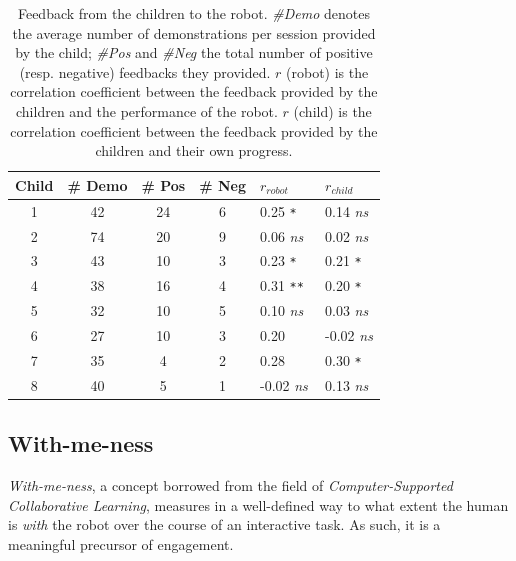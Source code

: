 \documentclass[10pt,a4paper]{article}
\begin{document}
\begin{table}
    \centering
    \caption{\footnotesize Feedback from the children to the robot. \emph{\#Demo}
        denotes the average number of demonstrations per session provided by the child;
        \emph{\#Pos} and \emph{\#Neg} the total number of positive (resp.
        negative) feedbacks they provided. $r$ (robot) is the correlation coefficient
        between the feedback provided by the children and the performance of the
        robot. $r$ (child) is the correlation coefficient
        between the feedback provided by the children and their own progress.
        }
    \begin{tabular}{ccccll}
        \toprule
        \bf Child      & \bf \# Demo & \bf \# Pos & \bf \# Neg & $r_{robot}$ & $r_{child}$ \\ \midrule
        1 & 42           & 24              & 6               & 0.25 \small\tt ** & 0.14 \small\it ns\\ 
        2 & 74           & 20              & 9               & 0.06 \small\it ns & 0.02 \small\it ns\\
        3 & 43           & 10              & 3               & 0.23 \small\tt ** & 0.21 \small\tt **\\
        4 & 38           & 16              & 4               & 0.31 \small\tt *** & 0.20 \small\tt **\\
        5   & 32           & 10              & 5               & 0.10 \small\it ns & 0.03 \small\it ns\\
        6 & 27           & 10              & 3               & 0.20 \small\tt * & -0.02 \small\it ns \\
        7   & 35           & 4               & 2               & 0.28 \small\tt * & 0.30 \small\tt ** \\
        8   & 40           & 5               & 1               & -0.02 \small\it ns & 0.13 \small\it ns\\ \bottomrule
    \end{tabular}

    \label{table:scores}
\end{table}


\subsection{With-me-ness}\label{with}
\emph{With-me-ness}, a concept borrowed from the
field of {\it Computer-Supported Collaborative Learning}, measures in a
well-defined way to what extent the human is \emph{with} the robot over the
course of an interactive task. As such, it is a meaningful precursor of
engagement. 
\end{document}
